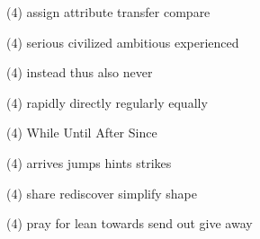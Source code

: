 \item
\begin{tasks}(4)
	\task assign
	\task attribute
	\task transfer
	\task compare
\end{tasks}
\item
\begin{tasks}(4)
	\task serious
	\task civilized
	\task ambitious
	\task experienced
\end{tasks}
\item
\begin{tasks}(4)
	\task instead
	\task thus
	\task also
	\task never
\end{tasks}
\item
\begin{tasks}(4)
	\task rapidly
	\task directly
	\task regularly
	\task equally
\end{tasks}
\item
\begin{tasks}(4)
	\task While
	\task Until
	\task After
	\task Since
\end{tasks}
\item
\begin{tasks}(4)
	\task arrives
	\task jumps
	\task hints
	\task strikes
\end{tasks}
\item
\begin{tasks}(4)
	\task share
	\task rediscover
	\task simplify
	\task shape
\end{tasks}
\item
\begin{tasks}(4)
	\task pray for
	\task lean towards
	\task send out
	\task give away
\end{tasks}